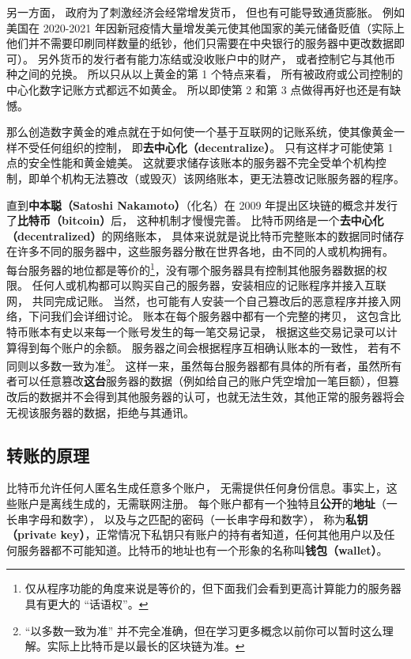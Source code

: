 另一方面， 政府为了刺激经济会经常增发货币， 但也有可能导致通货膨胀。 例如美国在 2020-2021 年因新冠疫情大量增发美元使其他国家的美元储备贬值（实际上他们并不需要印刷同样数量的纸钞，他们只需要在中央银行的服务器中更改数据即可）。 另外货币的发行者有能力冻结或没收账户中的财产， 或者控制它与其他币种之间的兑换。 所以只从以上黄金的第 1 个特点来看， 所有被政府或公司控制的中心化数字记账方式都远不如黄金。 所以即使第 2 和第 3 点做得再好也还是有缺憾。

那么创造数字黄金的难点就在于如何使一个基于互联网的记账系统，使其像黄金一样不受任何组织的控制， 即\textbf{去中心化（decentralize）}。 只有这样才可能使第 1 点的安全性能和黄金媲美。 这就要求储存该账本的服务器不完全受单个机构控制，即单个机构无法篡改（或毁灭）该网络账本，更无法篡改记账服务器的程序。

直到\textbf{中本聪（Satoshi Nakamoto）}（化名）在 2009 年提出区块链的概念并发行了\textbf{比特币（bitcoin）}后， 这种机制才慢慢完善。 比特币网络是一个\textbf{去中心化（decentralized）}的网络账本， 具体来说就是说比特币完整账本的数据同时储存在许多不同的服务器中，这些服务器分散在世界各地，由不同的人或机构拥有。 每台服务器的地位都是等价的\footnote{仅从程序功能的角度来说是等价的，但下面我们会看到更高计算能力的服务器具有更大的 “话语权”。}，没有哪个服务器具有控制其他服务器数据的权限。 任何人或机构都可以购买自己的服务器，安装相应的记账程序并接入互联网， 共同完成记账。 当然，也可能有人安装一个自己篡改后的恶意程序并接入网络，下问我们会详细讨论。 账本在每个服务器中都有一个完整的拷贝， 这包含比特币账本有史以来每一个账号发生的每一笔交易记录， 根据这些交易记录可以计算得到每个账户的余额。 服务器之间会根据程序互相确认账本的一致性， 若有不同则以多数一致为准\footnote{“以多数一致为准” 并不完全准确，但在学习更多概念以前你可以暂时这么理解。实际上比特币是以最长的区块链为准。}。 这样一来，虽然每台服务器都有具体的所有者，虽然所有者可以任意篡改\textbf{这台}服务器的数据（例如给自己的账户凭空增加一笔巨额），但篡改后的数据并不会得到其他服务器的认可，也就无法生效，其他正常的服务器将会无视该服务器的数据，拒绝与其通讯。

\subsection{转账的原理}
比特币允许任何人匿名生成任意多个账户， 无需提供任何身份信息。事实上，这些账户是离线生成的，无需联网注册。 每个账户都有一个独特且\textbf{公开}的\textbf{地址}（一长串字母和数字）， 以及与之匹配的密码（一长串字母和数字）， 称为\textbf{私钥（private key）}，正常情况下私钥只有账户的持有者知道，任何其他用户以及任何服务器都不可能知道。比特币的地址也有一个形象的名称叫\textbf{钱包（wallet）}。

